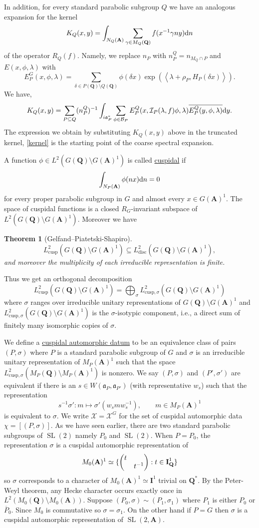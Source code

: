\documentclass[11pt]{amsart}
\def\A{\mathbf A}
\def\I{\mathbf I}
\def\Q{\mathbf Q}
\def\BBB{\mathcal B}
\def\III{\mathcal I}
\def\XXX{\mathcal X}
\def\aaa{\mathfrak a}
\def\cb#1{{\color{blue}#1}}
\def\d{\text d}
\def\bs{\setminus} 			%
\def\cusp{\text{cusp}}
\def\disc{\text{disc}}
\def\Ltwo{L^2}
\def\oP{\overline{P}}
\def\sl{\operatorname{SL}}
\def\sprod#1#2{\left\langle #1 , #2 \right\rangle}  %
\newtheorem{theorem}{Theorem}[section]
\theoremstyle{remark}
\begin{document}
In addition, for every standard parabolic subgroup $Q$ we have an analogous expansion for the kernel 
\[ K_Q(x, y) = \int_{N_Q(\A)} \sum_{\gamma \in M_Q(\Q)} f(x^{-1}\gamma n y) \d n \]
of the operator $R_Q(f)$. Namely, we replace $n_P$ with $n_P^Q = n_{M_Q \cap P}$ and $E(x, \phi, \lambda)$ with \[ E_P^G(x, \phi, \lambda) = \sum_{\delta \in P(\Q) \bs Q(\Q)} \phi(\delta x) \exp(\sprod{\lambda + \rho_P}{H_P(\delta x)}). \]
We have, 
\[ K_Q(x, y) = \sum_{P \subseteq Q} (n_P^Q)^{-1} \int_{i\aaa_P^*} \sum_{\phi \in \BBB_P}
		E_P^Q(x, \III_P(\lambda, f)\phi, \lambda) \overline{E_P^Q(y, \phi, \lambda)} \d y. \]
The expression we obtain by substituting $K_Q(x, y)$ above in the truncated kernel, \cref{kernel} is the starting point of the coarse spectral expansion. 

A function $\phi \in \Ltwo(G(\Q) \bs G(\A)^1)$ is called \underline{cuspidal} if 
\[ \int_{N_P(\A)} \phi(nx) \d n = 0 \]
for every proper parabolic subgroup in $G$ and almost every $x \in G(\A)^1$. The space of cuspidal functions is a closed $R_G$-invariant subspace of $\Ltwo(G(\Q)\bs G(\A)^1)$. Moreover we have
\begin{theorem} [Gelfand--Piatetski-Shapiro]
	\[ \Ltwo_\cusp(G(\Q)\bs G(\A)^1) \subseteq \Ltwo_\disc(G(\Q)\bs G(\A)^1), \]
	and moreover the multiplicity of each irreducible representation is finite. 
\end{theorem}
Thus we get an orthogonal decomposition
\[ \Ltwo_\cusp(G(\Q)\bs G(\A)^1) = \bigoplus_\sigma \Ltwo_{\cusp, \sigma} (G(\Q)\bs G(\A)^1) \]
where $\sigma$ ranges over irreducible unitary representations of $G(\Q)\bs G(\A)^1$ and $\Ltwo_{\cusp, \sigma} (G(\Q)\bs G(\A)^1)$ is the $\sigma$-isotypic component, i.e., a direct sum of finitely many isomorphic copies of $\sigma$. 

We define a \underline{cuspidal automorphic datum} to be an equivalence class of pairs $(P, \sigma)$ where $P$ is a standard parabolic subgroup of $G$ and $\sigma$ is an irreducible unitary representation of $M_P(\A)^1$ such that the space $\Ltwo_{\cusp, \sigma} (M_P(\Q)\bs M_P(\A)^1)$ is nonzero. We say $(P, \sigma)$ and $(P', \sigma')$ are equivalent if there is an $s \in W(\aaa_P, \aaa_{P'})$ (with representative $w_s$) such that the representation 
\[ s^{-1}\sigma' : m \mapsto \sigma'(w_s m w_s^{-1}), \qquad m \in M_P(\A)^1 \]
is equivalent to $\sigma$. We write $\XXX = \XXX^G$ for the set of cuspidal automorphic data $\chi = [(P, \sigma)]$. 
\cb{
As we have seen earlier, there are two standard parabolic subgroups of $\sl(2)$ namely $P_0$ and $\sl(2)$. When $P = P_0$, the representation $\sigma$ is a cuspidal automorphic representation of 
\[ M_0(\A)^1 \simeq \{ \begin{pmatrix} t & \\ & t^{-1} \end{pmatrix} : t \in \textbf I_\Q^1 \} \]
so $\sigma$ corresponds to a character of $M_0(\A)^1 \simeq \I^1$ trivial on $\Q^*$. By the Peter-Weyl theorem, any Hecke character occurs exactly once in $\Ltwo(M_0(\Q)\bs M_0(\A))$. Suppose $(P_0, \sigma) \sim (P_1, \sigma_1)$ where $P_1$ is either $P_0$ or $\oP_0$. Since $M_0$ is commutative so $\sigma = \sigma_1$. On the other hand if $P = G$ then $\sigma$ is a cuspidal automorphic representation of $\sl(2, \A)$.
}
\end{document}
